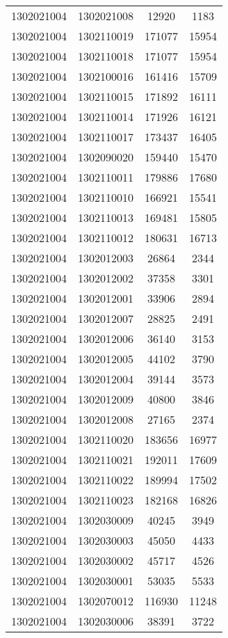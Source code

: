 \begin{longtable}[h]{llcc}
		1302021004 & 1302021008 & 12920 & 1183\\
		1302021004 & 1302110019 & 171077 & 15954\\
		1302021004 & 1302110018 & 171077 & 15954\\
		1302021004 & 1302100016 & 161416 & 15709\\
		1302021004 & 1302110015 & 171892 & 16111\\
		1302021004 & 1302110014 & 171926 & 16121\\
		1302021004 & 1302110017 & 173437 & 16405\\
		1302021004 & 1302090020 & 159440 & 15470\\
		1302021004 & 1302110011 & 179886 & 17680\\
		1302021004 & 1302110010 & 166921 & 15541\\
		1302021004 & 1302110013 & 169481 & 15805\\
		1302021004 & 1302110012 & 180631 & 16713\\
		1302021004 & 1302012003 & 26864 & 2344\\
		1302021004 & 1302012002 & 37358 & 3301\\
		1302021004 & 1302012001 & 33906 & 2894\\
		1302021004 & 1302012007 & 28825 & 2491\\
		1302021004 & 1302012006 & 36140 & 3153\\
		1302021004 & 1302012005 & 44102 & 3790\\
		1302021004 & 1302012004 & 39144 & 3573\\
		1302021004 & 1302012009 & 40800 & 3846\\
		1302021004 & 1302012008 & 27165 & 2374\\
		1302021004 & 1302110020 & 183656 & 16977\\
		1302021004 & 1302110021 & 192011 & 17609\\
		1302021004 & 1302110022 & 189994 & 17502\\
		1302021004 & 1302110023 & 182168 & 16826\\
		1302021004 & 1302030009 & 40245 & 3949\\
		1302021004 & 1302030003 & 45050 & 4433\\
		1302021004 & 1302030002 & 45717 & 4526\\
		1302021004 & 1302030001 & 53035 & 5533\\
		1302021004 & 1302070012 & 116930 & 11248\\
		1302021004 & 1302030006 & 38391 & 3722\\

\end{longtable}
